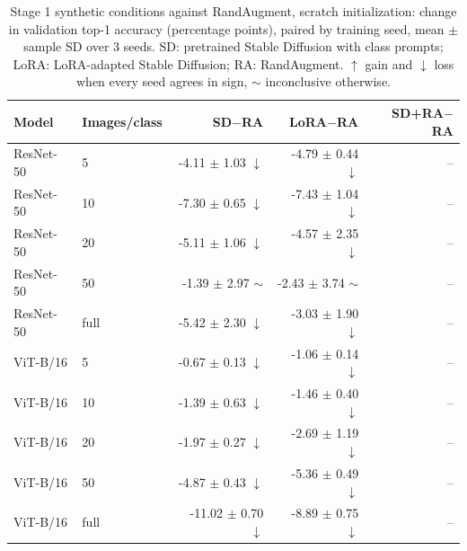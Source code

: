 \begin{table}[H]
\centering
\caption{Stage 1 synthetic conditions against RandAugment, scratch initialization: change in validation top-1 accuracy (percentage points), paired by training seed, mean $\pm$ sample SD over 3 seeds. SD: pretrained Stable Diffusion with class prompts; LoRA: LoRA-adapted Stable Diffusion; RA: RandAugment. $\uparrow$ gain and $\downarrow$ loss when every seed agrees in sign, $\sim$ inconclusive otherwise.}
\label{tab:stage1-scratch-accuracy-vs-randaugment}
\begin{tabular}{llrrr}
\toprule
Model & Images/class & SD$-$RA & LoRA$-$RA & SD+RA$-$RA \\
\midrule
ResNet-50 & 5 & -4.11 $\pm$ 1.03 $\downarrow$ & -4.79 $\pm$ 0.44 $\downarrow$ & -- \\
ResNet-50 & 10 & -7.30 $\pm$ 0.65 $\downarrow$ & -7.43 $\pm$ 1.04 $\downarrow$ & -- \\
ResNet-50 & 20 & -5.11 $\pm$ 1.06 $\downarrow$ & -4.57 $\pm$ 2.35 $\downarrow$ & -- \\
ResNet-50 & 50 & -1.39 $\pm$ 2.97 $\sim$ & -2.43 $\pm$ 3.74 $\sim$ & -- \\
ResNet-50 & full & -5.42 $\pm$ 2.30 $\downarrow$ & -3.03 $\pm$ 1.90 $\downarrow$ & -- \\
\midrule
ViT-B/16 & 5 & -0.67 $\pm$ 0.13 $\downarrow$ & -1.06 $\pm$ 0.14 $\downarrow$ & -- \\
ViT-B/16 & 10 & -1.39 $\pm$ 0.63 $\downarrow$ & -1.46 $\pm$ 0.40 $\downarrow$ & -- \\
ViT-B/16 & 20 & -1.97 $\pm$ 0.27 $\downarrow$ & -2.69 $\pm$ 1.19 $\downarrow$ & -- \\
ViT-B/16 & 50 & -4.87 $\pm$ 0.43 $\downarrow$ & -5.36 $\pm$ 0.49 $\downarrow$ & -- \\
ViT-B/16 & full & -11.02 $\pm$ 0.70 $\downarrow$ & -8.89 $\pm$ 0.75 $\downarrow$ & -- \\
\bottomrule
\end{tabular}
\end{table}
